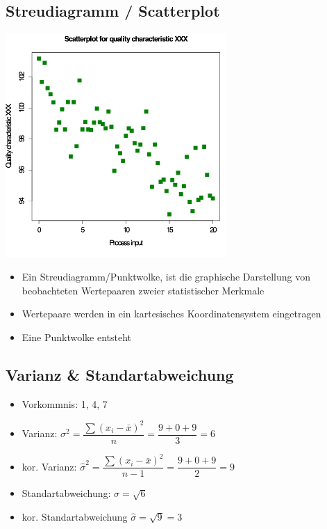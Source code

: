 \documentclass[8pt,a4paper]{scrartcl}
\begin{document}
\begin{multicols*}{3}
		\subsection{Streudiagramm / Scatterplot} 
			\includegraphics[height=8.5cm]{img/scatter.png}
				\begin{itemize}\itemsep0pt				
					\item Ein Streudiagramm/Punktwolke, ist die graphische Darstellung von beobachteten Wertepaaren zweier statistischer Merkmale
					\item Wertepaare werden in ein kartesisches Koordinatensystem eingetragen
					\item Eine Punktwolke entsteht
				\end{itemize}	

		\subsection{Varianz \& Standartabweichung}  
			\begin{itemize}\itemsep0pt				
				\item Vorkommnis: 1, 4, 7
				\item Varianz: $\sigma^{2} =  \dfrac{\sum(x_{i} -\bar{x})^{2}}{n} = \dfrac{9+0+9}{3} = 6$
				\item kor. Varianz: $\hat{\sigma}^{2} = \dfrac{\sum(x_{i} -\bar{x})^{2}}{n-1} = \dfrac{9+0+9}{2} = 9$
				\item Standartabweichung: $\sigma = \sqrt{6}$
				\item kor. Standartabweichung $\hat{\sigma} = \sqrt{9} = 3$
			\end{itemize}

\end{multicols*}
\end{document}

